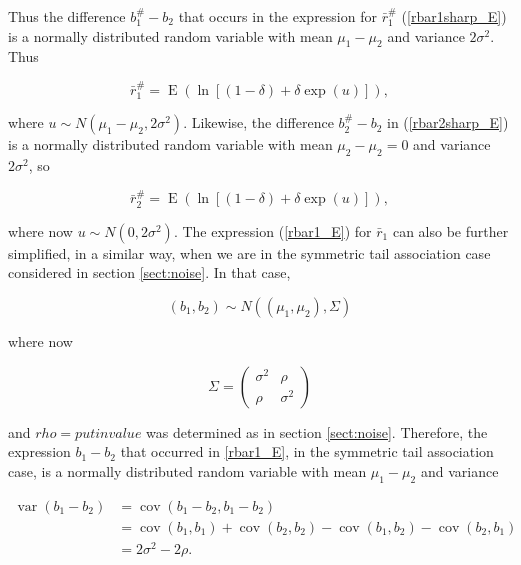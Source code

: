 \documentclass[letterpaper,11pt]{article}
\DeclareMathOperator{\EX}{E}%
\DeclareMathOperator{\VarX}{var}
\DeclareMathOperator{\CovX}{cov}
\begin{document}
\noindent Thus the difference $b_1^\#-b_2$ that occurs in the expression for $\bar r_1^\#$ (\ref{rbar1sharp_E}) is a normally distributed random variable with mean $\mu_1-\mu_2$ and variance $2\sigma^2$. 
Thus

\begin{equation}
\bar r_1^\#=\EX(\ln [(1-\delta)+\delta \exp(u)]),  \label{rbar1sharp_E_usub}
\end{equation}

\noindent where $u \sim N(\mu_1-\mu_2,2\sigma^2)$. 
Likewise, the difference $b_2^\#-b_2$ in (\ref{rbar2sharp_E}) is a normally distributed random variable with mean $\mu_2-\mu_2=0$ and variance $2\sigma^2$, so

\begin{equation}
\bar r_2^\#=\EX(\ln [(1-\delta)+\delta \exp(u)]),  \label{rbar2sharp_E_usub}
\end{equation}

\noindent where now $u \sim N(0,2\sigma^2)$. 
The expression (\ref{rbar1_E}) for $\bar r_1$ can also be further simplified, in a similar way, when we are in the symmetric tail association case considered in section \ref{sect:noise}. 
In that case,

\begin{equation}
(b_1,b_2) \sim  N(( \mu_1,\mu_2), \Sigma) \label{b1b2_distribution_sym}
\end{equation}

\noindent where now

\begin{equation}
\Sigma = \begin{pmatrix} \sigma^2&\rho\\\rho&\sigma^2\end{pmatrix} \label{Sigmamat_rho}
\end{equation}

\noindent and $rho=put in value$ was determined as in section \ref{sect:noise}.
Therefore, the expression $b_1-b_2$ that occurred in \ref{rbar1_E}, in the symmetric tail association case, is a normally distributed random variable with mean $\mu_1-\mu_2$ and variance

\begin{align}
\VarX(b_1-b_2)&=\CovX(b_1-b_2, b_1-b_2) \\
                        &=\CovX(b_1,b_1)+\CovX(b_2,b_2)-\CovX(b_1,b_2)-\CovX(b_2,b_1) \\
                        &=2\sigma^2-2\rho.
\end{align}
\end{document}
